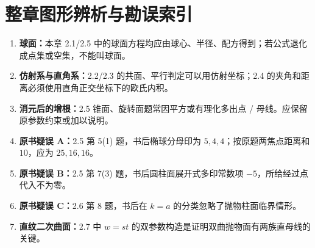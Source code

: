 \section*{整章图形辨析与勘误索引}
\begin{enumerate}
\item \textbf{球面：}本章 2.1/2.5 中的球面方程均应由球心、半径、配方得到；若公式退化成点集或空集，不能叫球面。
\item \textbf{仿射系与直角系：}2.2/2.3 的共面、平行判定可以用仿射坐标；2.4 的夹角和距离必须使用直角正交坐标下的欧氏内积。
\item \textbf{消元后的增根：}2.5 锥面、旋转面题常因平方或有理化多出点 / 母线。应保留原参数约束或加以说明。
\item \textbf{原书疑误 A：}2.5 第 5(1) 题，书后椭球分母印为 $5,4,4$；按原题两焦点距离和 $10$，应为 $25,16,16$。
\item \textbf{原书疑误 B：}2.5 第 7(3) 题，书后圆柱面展开式多印常数项 $-5$，所给经过点代入不为零。
\item \textbf{原书疑误 C：}2.6 第 8 题，书后在 $k=a$ 的分类忽略了抛物柱面临界情形。
\item \textbf{直纹二次曲面：}2.7 中 $w=st$ 的双参数构造是证明双曲抛物面有两族直母线的关键。
\end{enumerate}

